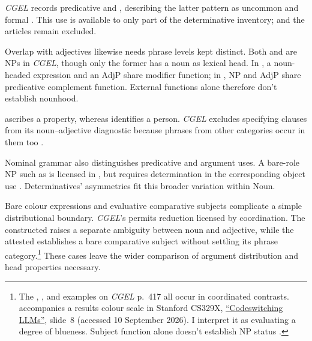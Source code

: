 \documentclass[12pt]{article}
\begin{document}
\textit{CGEL} records predicative  and , describing the latter pattern as uncommon and formal \citep[392, 395--396]{huddleston2002}. This use is available to only part of the determinative inventory;  and the articles remain excluded.

Overlap with adjectives likewise needs phrase levels kept distinct. Both  and  are NPs in \textit{CGEL}, though only the former has a noun as lexical head. In , a noun-headed expression and an AdjP share modifier function; in , NP and AdjP share predicative complement function. External functions alone therefore don't establish nounhood.

 ascribes a property, whereas  identifies a person. \textit{CGEL} excludes specifying  clauses from its noun--adjective diagnostic because phrases from other categories occur in them too \citep[536]{huddleston2002}.

Nominal grammar also distinguishes predicative and argument uses. A bare-role NP such as  is licensed in , but requires determination in the corresponding object use  \citep[328]{huddleston2002}. Determinatives' asymmetries fit this broader variation within Noun.

Bare colour expressions and evaluative comparative subjects complicate a simple distributional boundary. \textit{CGEL}'s  permits reduction licensed by coordination. The constructed  raises a separate ambiguity between noun and adjective, while the attested  establishes a bare comparative subject without settling its phrase category.\footnote{The , , and  examples on \textit{CGEL} p.~417 all occur in coordinated contrasts.  accompanies a results colour scale in Stanford CS329X, \href{https://web.stanford.edu/class/cs329x/slides/Lecture12_B_Codeswitching\%20LLMs.pdf}{\enquote{Codeswitching LLMs}}, slide~8 (accessed 10 September 2026). I interpret it as evaluating a degree of blueness. Subject function alone doesn't establish NP status \citep[236]{huddleston2002}.} These cases leave the wider comparison of argument distribution and head properties necessary.
\end{document}
